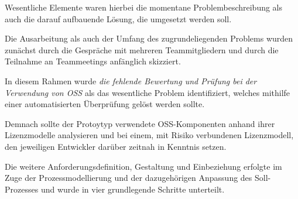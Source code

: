 Wesentliche Elemente waren hierbei die momentane Problembeschreibung als auch die darauf aufbauende Lösung, die umgesetzt werden soll. 

Die Ausarbeitung als auch der Umfang des zugrundeliegenden Problems wurden zunächst durch die Gespräche mit mehreren Teammitgliedern und durch die Teilnahme an Teammeetings anfänglich skizziert.

In diesem Rahmen wurde \textit{die fehlende Bewertung und Prüfung bei der Verwendung von OSS} als das wesentliche Problem identifiziert, welches mithilfe einer automatisierten Überprüfung gelöst werden sollte.  

Demnach sollte der Protoytyp verwendete OSS-Komponenten anhand ihrer Lizenzmodelle analysieren und bei einem, mit Risiko verbundenen Lizenzmodell, den jeweiligen Entwickler darüber zeitnah in Kenntnis setzen.  

Die weitere Anforderungsdefinition, Gestaltung und Einbeziehung erfolgte im Zuge der Prozessmodellierung und der dazugehörigen Anpassung des Soll-Prozesses und wurde in vier grundlegende Schritte unterteilt.



